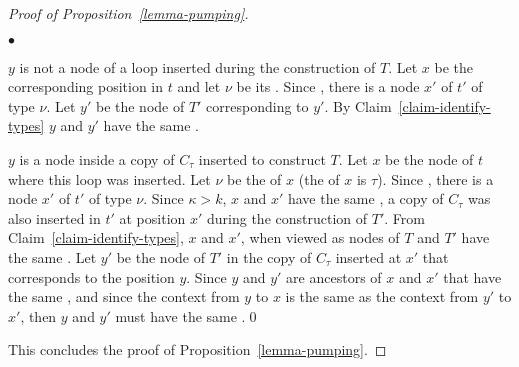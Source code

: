 \begin{proof}[Proof of Proposition~\ref{lemma-pumping}]
\begin{iteMize}{$\bullet$}
\item $y$ is not a node of a loop inserted during the construction of $T$. Let
  $x$ be the corresponding position in $t$ and let $\nu$ be its \type{\kappa}. Since
  , there is a node $x'$ of $t'$ of type $\nu$. Let $y'$
  be the node of $T'$ corresponding to $y'$. By
  Claim~\ref{claim-identify-types} $y$ and $y'$ have the same .

\item $y$ is a node inside a copy of $C_\tau$ inserted to construct $T$. Let $x$ be the
  node of $t$ where this loop was inserted. Let $\nu$ be the \type{\kappa} of $x$ (the \ktype of
  $x$ is $\tau$).  Since , there is a node $x'$ of $t'$ of
  type $\nu$. Since $\kappa > k$, $x$ and $x'$ have the same , a
  copy of $C_\tau$ was also inserted in $t'$ at position $x'$ during the
  construction of $T'$. From Claim~\ref{claim-identify-types}, $x$ and
  $x'$, when viewed as nodes of $T$ and $T'$ have the same .  Let $y'$ be the node of $T'$ in the copy of
  $C_\tau$ inserted at $x'$ that corresponds to the position $y$. Since $y$ and
  $y'$ are ancestors of $x$ and $x'$ that have the same , and since the
  context from $y$ to $x$ is the same as the context from $y'$ to $x'$, then $y$ and $y'$ must have the same
  .\qed
\end{iteMize}

\noindent This concludes the proof of Proposition~\ref{lemma-pumping}.
\end{proof}


